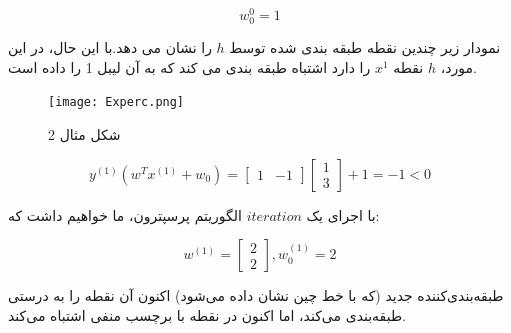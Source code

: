 \documentclass[12pt]{article}
\begin{document}
\[
w^0_0=1
\]

نمودار زیر چندین نقطه طبقه بندی شده توسط $h$ را نشان می دهد.با این حال، در این مورد، $h$ نقطه $x^1$ را دارد اشتباه طبقه بندی می کند که به آن لیبل 1 را داده است.

\begin{figure}[h]
    \centering
    \texttt{[image: Experc.png]}
    \caption{شکل مثال 2}
    \label{fig:}
\end{figure}


\[
y^{(1)}(w^{T}x^{(1)}+w_{0})=\begin{bmatrix}1 & -1\end{bmatrix}\begin{bmatrix}1 \\ 3\end{bmatrix}+1=-1<0
\]

با اجرای یک $iteration$ الگوریتم پرسپترون، ما خواهیم داشت که:

\[
w^{(1)}=\begin{bmatrix}2 \\ 2\end{bmatrix},
w^{(1)}_0=2
\]

طبقه‌بندی‌کننده جدید (که با خط چین نشان داده می‌شود) اکنون آن نقطه را به درستی طبقه‌بندی می‌کند، اما اکنون در نقطه با برچسب منفی اشتباه می‌کند.
\end{document}
